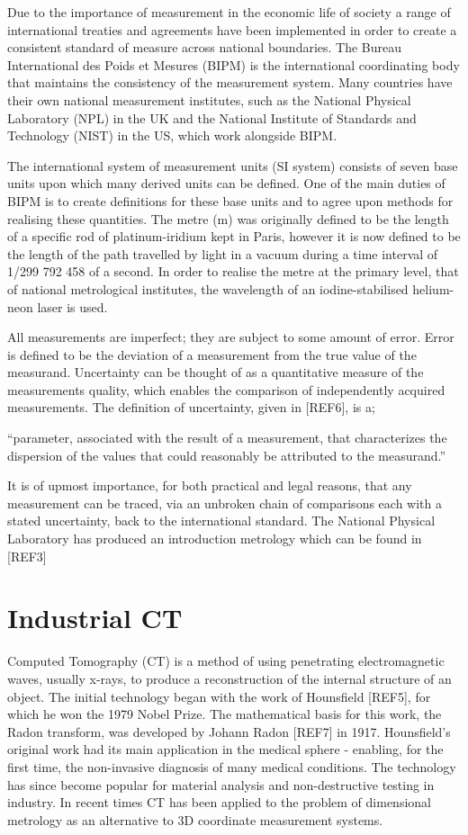 \documentclass[
  twoside,
  11pt, a4paper,
  footinclude=true,
  headinclude=true,
  cleardoublepage=empty
]{scrbook}
\begin{document}
Due to the importance of measurement in the economic life of society a range of international treaties and agreements have been implemented in order to create a consistent standard of measure across national boundaries. The Bureau International des Poids et Mesures (BIPM) is the international coordinating body that maintains the consistency of the measurement system. Many countries have their own national measurement institutes, such as the National Physical Laboratory (NPL) in the UK and the National Institute of Standards and Technology (NIST) in the US, which work alongside BIPM.

The international system of measurement units (SI system) consists of seven base units upon which many derived units can be defined. One of the main duties of BIPM is to create definitions for these base units and to agree upon methods for realising these quantities. The metre (m) was originally defined to be the length of a specific rod of platinum-iridium kept in Paris, however it is now defined to be the length of the path travelled by light in a vacuum during a time interval of 1/299 792 458 of a second. In order to realise the metre at the primary level, that of national metrological institutes, the wavelength of an iodine-stabilised helium-neon laser is used.

All measurements are imperfect; they are subject to some amount of error. Error is defined to be the deviation of a measurement from the true value of the measurand. Uncertainty can be thought of as a quantitative measure of the measurements quality, which enables the comparison of independently acquired measurements. The definition of uncertainty, given in [REF6], is a;

``parameter, associated with the result of a measurement, that characterizes the dispersion of the values that could reasonably be attributed to the measurand.''

It is of upmost importance, for both practical and legal reasons, that any measurement can be traced, via an unbroken chain of comparisons each with a stated uncertainty, back to the international standard. The National Physical Laboratory has produced an introduction metrology which can be found in [REF3]

\section{Industrial CT}

Computed Tomography (CT) is a method of using penetrating electromagnetic waves, usually x-rays, to produce a reconstruction of the internal structure of an object. The initial technology began with the work of Hounsfield [REF5], for which he won the 1979 Nobel Prize. The mathematical basis for this work, the Radon transform, was developed by Johann Radon [REF7] in 1917. Hounsfield’s original work had its main application in the medical sphere - enabling, for the first time, the non-invasive diagnosis of many medical conditions. The technology has since become popular for material analysis and non-destructive testing in industry. In recent times CT has been applied to the problem of dimensional metrology as an alternative to 3D coordinate measurement systems.
\end{document}
